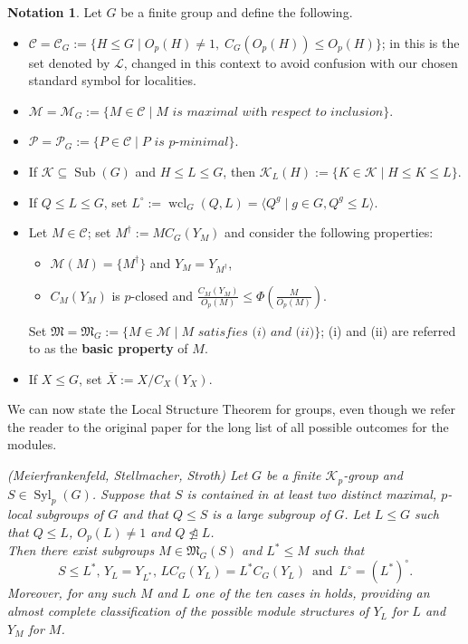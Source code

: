 \documentclass{amsart}
\numberwithin{equation}{section}
\theoremstyle{definition}
\newtheorem{notation}[equation]{Notation}
\theoremstyle{subresult}
\theoremstyle{caseresult}
\newcounter{maintheorem}
\renewcommand{\themaintheorem}{}
\newenvironment{maintheorem}[1]
{%
	\def\customname{#1}%
	\renewcommand{\themaintheorem}{\customname}%
	\refstepcounter{maintheorem}%
	\trivlist
	\item[\hskip\labelsep\bfseries Theorem~\themaintheorem.]%
	\itshape
}
{%
	\endtrivlist
}
\newcommand{\M}{\mathcal{M}}
\newcommand{\gM}{\mathfrak{M}}
\renewcommand{\L}{\mathcal{L}}
\newcommand{\C}{\mathcal{C}}
\newcommand{\K}{\mathcal{K}}
\renewcommand{\P}{\mathcal{P}}
\newcommand{\Syl}{\operatorname{Syl}}
\newcommand{\wcl}{\operatorname{wcl}}
\newcommand{\Sub}{\operatorname{Sub}}
\newcommand{\ov}{\overline}
\newcommand{\norm}{\trianglelefteq}
\newcommand{\<}{\langle}
\renewcommand{\>}{\rangle}
\begin{document}
\begin{notation}\label{notation for groups}
	Let $G$ be a finite group and define the following.
	\begin{itemize}
		\item $\C = \C_G := \{H \le G \mid O_p(H) \ne 1, \; C_G(O_p(H)) \le O_p(H) \}$; in \cite{Meier-Stell-Stroth:2012} this is the set denoted by $\L$, changed in this context to avoid confusion with our chosen standard symbol for localities.
		\item $\M = \M_G := \{ M \in \C \mid \textit{$M$ is maximal with respect to inclusion} \}$.
		\item $\P = \P_G := \{ P \in \C \mid \textit{$P$ is $p$-minimal} \}$.
		\item If $\K \subseteq \Sub(G)$ and $H \le L \le G$, then $\K_L(H) := \{ K \in \K \mid H \le K \le L \}$.
        \item If $Q \le L \le G$, set $L^\circ := \wcl_G(Q,L) = \< Q^g \mid g \in G, Q^g \le L \>$.
		\item Let $M \in \C$; set $M^\dagger :=MC_G(Y_M)$ and consider the following properties:
			\begin{itemize}
				\item[(i)] $\M(M) = \{M^\dagger\}$ and $Y_M = Y_{M^\dagger}$,
				\item[(ii)] $C_M(Y_M)$ is $p$-closed and $\displaystyle \frac{C_M(Y_M)}{O_p(M)} \le \Phi \left( \frac{M}{O_p(M)} \right)$.
			\end{itemize}
			Set $\gM = \gM_G := \{ M \in \M \mid \textit{$M$ satisfies (i) and (ii)} \}$; (i) and (ii) are referred to as the {\bf basic property} of $M$.
        \item If $X \le G$, set $\ov{X} := X / C_X(Y_X)$.
	\end{itemize}
\end{notation}

We can now state the Local Structure Theorem for groups, even though we refer the reader to the original paper for the long list of all possible outcomes for the modules.

\begin{maintheorem}{A}{\normalfont (Meierfrankenfeld, Stellmacher, Stroth)}
	\label{theorem A}
    Let $G$ be a finite $\K_p$-group and $S \in \Syl_p(G)$. Suppose that $S$ is contained in at least two distinct maximal, $p$-local subgroups of $G$ and that $Q \le S$ is a large subgroup of $G$. Let $L \le G$ such that $Q \le L$, $O_p(L) \ne 1$ and $Q \not \norm L$.\\
    Then there exist subgroups $M \in \gM_G(S)$ and $L^* \le M$ such that
    \[
        S \le L^*, \, Y_L = Y_{L^*}, \, L C_G(Y_L) = L^* C_G(Y_L) \, \text{ and } \, L^\circ = (L^*)^\circ .
    \]
    Moreover, for any such $M$ and $L$ one of the ten cases in \cite[Theorem A]{Meier-Stell-Stroth:2012} holds, providing an almost complete classification of the possible module structures of $Y_L$ for $L$ and $Y_M$ for $M$.
\end{maintheorem}
\end{document}
